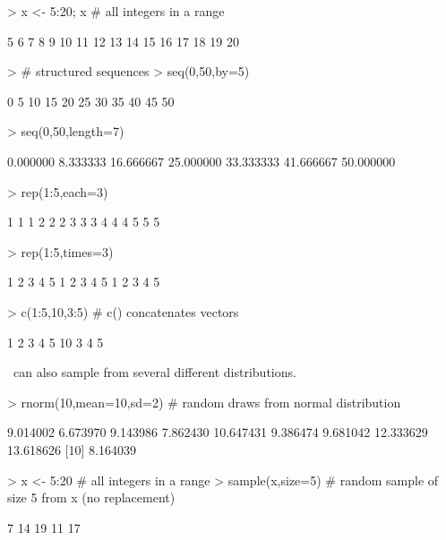 \begin{Schunk}
\begin{Sinput}
> x <- 5:20; x                 # all integers in a range
\end{Sinput}
\begin{Soutput}
 [1]  5  6  7  8  9 10 11 12 13 14 15 16 17 18 19 20
\end{Soutput}
\begin{Sinput}
> # structured sequences
> seq(0,50,by=5)               
\end{Sinput}
\begin{Soutput}
 [1]  0  5 10 15 20 25 30 35 40 45 50
\end{Soutput}
\begin{Sinput}
> seq(0,50,length=7)               
\end{Sinput}
\begin{Soutput}
[1]  0.000000  8.333333 16.666667 25.000000 33.333333 41.666667 50.000000
\end{Soutput}
\begin{Sinput}
> rep(1:5,each=3)
\end{Sinput}
\begin{Soutput}
 [1] 1 1 1 2 2 2 3 3 3 4 4 4 5 5 5
\end{Soutput}
\begin{Sinput}
> rep(1:5,times=3)
\end{Sinput}
\begin{Soutput}
 [1] 1 2 3 4 5 1 2 3 4 5 1 2 3 4 5
\end{Soutput}
\begin{Sinput}
> c(1:5,10,3:5)                # c() concatenates vectors
\end{Sinput}
\begin{Soutput}
[1]  1  2  3  4  5 10  3  4  5
\end{Soutput}
\end{Schunk}

\R\ can also sample from several different distributions.

\begin{Schunk}
\begin{Sinput}
> rnorm(10,mean=10,sd=2)    # random draws from normal distribution
\end{Sinput}
\begin{Soutput}
 [1]  9.014002  6.673970  9.143986  7.862430 10.647431  9.386474  9.681042 12.333629 13.618626
[10]  8.164039
\end{Soutput}
\begin{Sinput}
> x <- 5:20                 # all integers in a range
> sample(x,size=5)          # random sample of size 5 from x (no replacement)
\end{Sinput}
\begin{Soutput}
[1]  7 14 19 11 17
\end{Soutput}
\end{Schunk}

